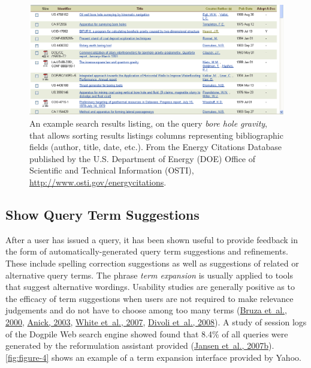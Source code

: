 \documentclass[sigconf,nonacm,screen,pbalance]{acmart}
\begin{document}
\begin{figure}[ht]
    \includegraphics[width=\columnwidth]{./doecolumns.png}
    \vspace{-20pt}
    \caption{An example search results listing, on the query {\em  bore hole
    gravity}, that allows sorting results listings columns representing bibliographic fields (author,
    title, date, etc.). From the Energy Citations Database published by the U.S. Department of Energy
    (DOE) Office of Scientific and Technical Information (OSTI), \url{http://www.osti.gov/energycitations}.
    }
    \label{fig:figure-3}
    \vspace{-10pt}
\end{figure}

\subsection{Show Query Term Suggestions}

After a user has issued a query, it has been shown useful to provide feedback in the form of
automatically-generated query term suggestions and refinements. These include spelling correction
suggestions as well as suggestions of related or alternative query terms. The phrase {\em  term
expansion} is usually applied to tools that suggest alternative wordings. Usability studies are
generally positive as to the efficacy of term suggestions when users are not required to make relevance
judgements and do not have to choose among too many terms (\href{https://searchuserinterfaces.com/book/sui_references.html#bruza2000iis}{Bruza et~al., 2000}, \href{https://searchuserinterfaces.com/book/sui_references.html#anick2003utf}{ Anick, 2003}, \href{https://searchuserinterfaces.com/book/sui_references.html#white2007sup}{ White et~al., 2007}, \href{https://searchuserinterfaces.com/book/sui_references.html#divoli2008esg}{ Divoli et~al., 2008}). A study of session
logs of the Dogpile Web search engine showed found that 8.4\% of all queries were generated by the
reformulation assistant provided (\href{https://searchuserinterfaces.com/book/sui_references.html#jansen2007wsi}{Jansen et~al., 2007b}). \autoref{fig:figure-4} shows an
example of a term expansion interface provided by Yahoo.
\end{document}
